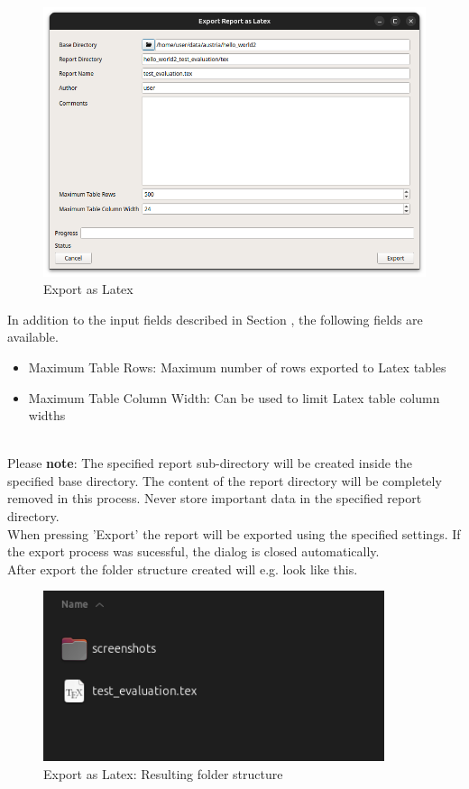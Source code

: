 \begin{figure}[H]
    \hspace*{-2.5cm}
    \center
    \includegraphics[width=12cm,frame]{figures/export_latex.png}
  \caption{Export as Latex}
\end{figure}

In addition to the input fields described in Section , 
the following fields are available.

\begin{itemize}  
    \item Maximum Table Rows: Maximum number of rows exported to Latex tables
    \item Maximum Table Column Width: Can be used to limit Latex table column widths
\end{itemize}
\ \\

Please \textbf{note}: The specified report sub-directory will be created inside the specified base directory.
The content of the report directory will be completely removed in this process.
Never store important data in the specified report directory. \\

When pressing 'Export' the report will be exported using the specified settings.
If the export process was sucessful, the dialog is closed automatically. \\

After export the folder structure created will e.g. look like this.

\begin{figure}[H]
    \hspace*{-2.5cm}
    \center
    \includegraphics[width=10cm,frame]{figures/export_latex_result.png}
  \caption{Export as Latex: Resulting folder structure}
\end{figure}

